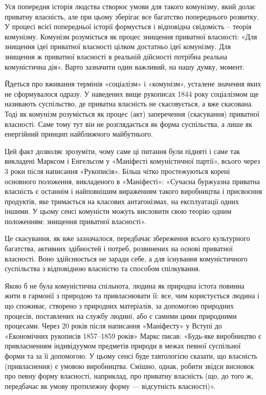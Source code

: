 \documentclass[../main]{subfiles}
\begin{document}
Уся попередня історія людства створює умови для такого комунізму, який долає приватну власність, але при цьому зберігає все багатство попереднього розвитку. У процесі всієї попередньої історії формується і відповідна свідомість – теорія комунізму. Комунізм розуміється як процес знищення приватної власності: «Для знищення ідеї приватної власності цілком достатньо ідеї комунізму. Для знищення ж приватної власності в реальній дійсності потрібна реальна комуністична дія». Варто зазначити один важливий, на нашу думку, момент.

Йдеться про вживання термінів «соціалізм» і «комунізм», усталене значення яких не сформувалося одразу. У наведених вище рукописах 1844 року соціалізмом ще називають суспільство, де приватна власність не скасовується, а вже скасована. Тоді як комунізм розуміється як процес (акт) заперечення (скасування) приватної власності. Саме тому тут він не розглядається як форма суспільства, а лише як енергійний принцип найближчого майбутнього.

Цей факт дозволяє зрозуміти, чому саме ці питання були підняті і саме так викладені Марксом і Енгельсом у «Маніфесті комуністичної партії», всього через 3 роки після написання «Рукописів». Більш чітко простежуються корені основного положення, викладеного в «Маніфесті»: «Сучасна буржуазна приватна власність є останнім і найповнішим вираженням такого виробництва і присвоєння продуктів, яке тримається на класових антагонізмах, на експлуатації одних іншими. У цьому сенсі комуністи можуть висловити свою теорію одним положенням: знищення приватної власності».

Це скасування, як вже зазначалося, передбачає збереження всього культурного багатства, активних здібностей і потреб, розвинених на основі приватної власності. Воно здійснюється не заради себе, а для існування комуністичного суспільства з відповідною власністю та способом спілкування.

Якою б не була комуністична спільнота, людина як природна істота повинна жити в гармонії з природою та привласнювати її: все, чим користується людина і що споживає, створено з природних матеріалів, за допомогою природних процесів, поставлених на службу людині, або є самими цими природними процесами. Через 20 років після написання «Маніфесту» у Вступі до «Економічних рукописів 1857–1859 років» Маркс писав: «Будь-яке виробництво є привласненням індивідуумом предметів природи в межах певної суспільної форми та за її допомогою. У цьому сенсі буде тавтологією сказати, що власність (привласнення) є умовою виробництва. Смішно, однак, робити звідси висновок про певну форму власності, наприклад, про приватну власність (що, до того ж, передбачає як умову протилежну форму — відсутність власності)».
\end{document}
